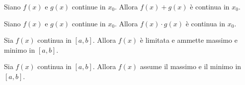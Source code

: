 \documentclass{book}
\begin{document}
\begin{theorem}
    Siano \(f(x)\) e \(g(x)\) continue in \(x_0\). Allora \(f(x) + g(x)\) è continua in \(x_0\).
\end{theorem}

\begin{theorem}
    Siano \(f(x)\) e \(g(x)\) continue in \(x_0\). Allora \(f(x) \cdot g(x)\) è continua in \(x_0\).
\end{theorem}

\begin{theorem}
    Sia \(f(x)\) continua in \([a,b]\). Allora \(f(x)\) è limitata e ammette massimo e minimo in \([a,b]\).
\end{theorem}

\begin{theorem}
    Sia \(f(x)\) continua in \([a,b]\). Allora \(f(x)\) assume il massimo e il minimo in \([a,b]\).
\end{theorem}
\end{document}
